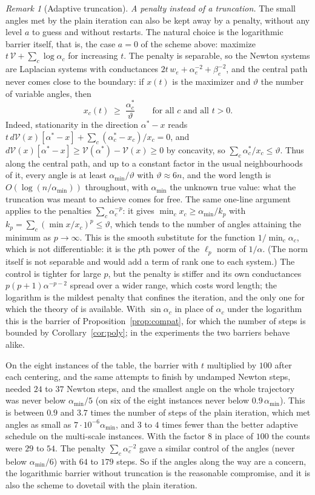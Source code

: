 \documentclass[11pt]{amsart}
\theoremstyle{definition}
\theoremstyle{remark}
\newtheorem{remark}[theorem]{Remark}
\begin{document}
\begin{remark}[Adaptive truncation]
\emph{A penalty instead of a truncation.} The small angles met by the plain iteration can also be kept away by a penalty, without any level $a$ to guess and without restarts. The natural choice is the logarithmic barrier itself, that is, the case $a=0$ of the scheme above: maximize $t\,\mathcal V+\sum_c\log\alpha_c$ for increasing $t$.
The penalty is separable, so the Newton systems are Laplacian systems with conductances $2t\,w_e+\alpha_e^{-2}+\beta_e^{-2}$, and the central path never comes close to the boundary: if $x(t)$ is the maximizer and $\vartheta$ the number of variable angles, then
\[
x_c(t)\;\ge\;\frac{\alpha^*_c}{\vartheta}\qquad\text{for all $c$ and all $t>0$.}
\]
Indeed, stationarity in the direction $\alpha^*-x$ reads $t\,d\mathcal V(x)[\alpha^*-x]+\sum_c(\alpha^*_c-x_c)/x_c=0$, and $d\mathcal V(x)[\alpha^*-x]\ge\mathcal V(\alpha^*)-\mathcal V(x)\ge0$ by concavity, so $\sum_c\alpha^*_c/x_c\le\vartheta$.
Thus along the central path, and up to a constant factor in the usual neighbourhoods of it, every angle is at least $\alpha_{\min}/\vartheta$ with $\vartheta\approx6n$, and the word length is $O(\log(n/\alpha_{\min}))$ throughout, with $\alpha_{\min}$ the unknown true value: what the truncation was meant to achieve comes for free.
The same one-line argument applies to the penalties $\sum_c\alpha_c^{-p}$: it gives $\min_cx_c\ge\alpha_{\min}/k_p$ with $k_p=\sum_c(\min x/x_c)^p\le\vartheta$, which tends to the number of angles attaining the minimum as $p\to\infty$. This is the smooth substitute for the function $1/\min_c\alpha_c$, which is not differentiable: it is the $p$th power of the $\ell_p$ norm of $1/\alpha$.
(The norm itself is not separable and would add a term of rank one to each system.) The control is tighter for large $p$, but the penalty is stiffer and its own conductances $p(p+1)\alpha^{-p-2}$ spread over a wider range, which costs word length; the logarithm is the mildest penalty that confines the iteration, and the only one for which the theory of \cite{NN94} is available.
With $\sin\alpha_c$ in place of $\alpha_c$ under the logarithm this is the barrier of Proposition~\ref{prop:compat}, for which the number of steps is bounded by Corollary~\ref{cor:poly}; in the experiments the two barriers behave alike.

On the eight instances of the table, the barrier with $t$ multiplied by $100$ after each centering, and the same attempts to finish by undamped Newton steps, needed $24$ to $37$ Newton steps, and the smallest angle on the whole trajectory was never below $\alpha_{\min}/5$ (on six of the eight instances never below $0.9\,\alpha_{\min}$).
This is between $0.9$ and $3.7$ times the number of steps of the plain iteration, which met angles as small as $7\cdot10^{-6}\alpha_{\min}$, and $3$ to $4$ times fewer than the better adaptive schedule on the multi-scale instances. With the factor $8$ in place of $100$ the counts were $29$ to $54$. The penalty $\sum_c\alpha_c^{-2}$ gave a similar control of the angles (never below $\alpha_{\min}/6$) with $64$ to $179$ steps.
So if the angles along the way are a concern, the logarithmic barrier without truncation is the reasonable compromise, and it is also the scheme to dovetail with the plain iteration.
\end{remark}
\end{document}
